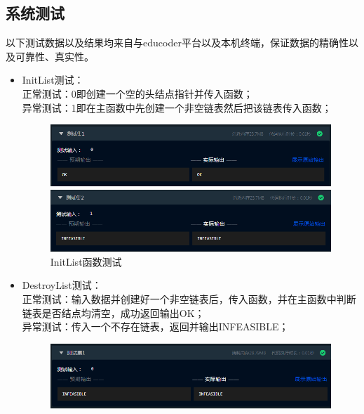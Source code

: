 \documentclass[supercite]{Experimental_Report}
\theoremstyle{definition}
\begin{document}
\subsection{系统测试}
以下测试数据以及结果均来自与educoder平台以及本机终端，保证数据的精确性以及可靠性、真实性。
\begin{itemize}
	\item InitList测试：\\
	      正常测试：0即创建一个空的头结点指针并传入函数；\\
	      异常测试：1即在主函数中先创建一个非空链表然后把该链表传入函数；
	      \begin{figure}[htbp]
		      \centering
		      \begin{minipage}{0.9\linewidth}
			      \centering
			      \includegraphics[width=0.9\linewidth]{images/text-1.png}
		      \end{minipage}
		      \begin{minipage}{0.9\linewidth}
			      \centering
			      \includegraphics[width=0.9\linewidth]{images/text-2.png}
		      \end{minipage}
		      \caption{InitList函数测试}
		      \label{fig1-4}
	      \end{figure}
	\item DestroyList测试：\\
	      正常测试：输入数据并创建好一个非空链表后，传入函数，并在主函数中判断链表是否结点均清空，成功返回输出OK；\\
	      异常测试：传入一个不存在链表，返回并输出INFEASIBLE；
	      \begin{figure}[htbp]
		      \centering
		      \begin{minipage}{0.9\linewidth}
			      \centering
			      \includegraphics[width=0.9\linewidth]{images/text-3.png}

\end{minipage}
\end{figure}
\end{itemize}
\end{document}
